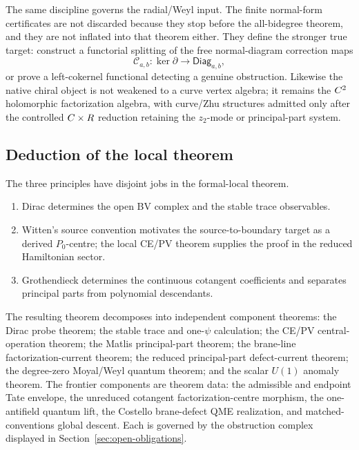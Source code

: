 The same discipline governs the radial/Weyl input.  The finite
normal-form certificates are not discarded because they stop before the
all-bidegree theorem, and they are not inflated into that theorem either.
They define the stronger true target: construct a functorial splitting
of the free normal-diagram correction maps
\[
  \mathcal C_{a,b}\colon
  \ker\partial\longrightarrow\mathsf{Diag}_{a,b},
\]
or prove a left-cokernel functional detecting a genuine obstruction.
Likewise the native chiral object is not weakened to a curve vertex
algebra; it remains the \(C^2\) holomorphic factorization algebra, with
curve/Zhu structures admitted only after the controlled
\(C\times R\) reduction retaining the \(z_2\)-mode or principal-part
system.

\subsection{Deduction of the local theorem}

The three principles have disjoint jobs in the formal-local theorem.

\begin{enumerate}
  \item Dirac determines the open BV complex and the stable trace
  observables.
  \item Witten's source convention motivates the source-to-boundary target as a
  derived \(P_0\)-centre; the local CE/PV theorem supplies the proof in
  the reduced Hamiltonian sector.
  \item Grothendieck determines the continuous cotangent coefficients
  and separates principal parts from polynomial descendants.
\end{enumerate}

The resulting theorem decomposes into independent
component theorems: the Dirac probe theorem; the stable trace and
one-\(\psi\) calculation; the CE/PV central-operation theorem; the Matlis
principal-part theorem; the brane-line factorization-current theorem;
the reduced principal-part defect-current theorem; the degree-zero
Moyal/Weyl quantum theorem; and the scalar \(U(1)\) anomaly theorem.
The frontier components are theorem data: the admissible and endpoint
Tate envelope, the unreduced cotangent factorization-centre morphism,
the one-antifield quantum lift, the Costello brane-defect QME
realization, and matched-conventions global descent.  Each is governed
by the obstruction complex displayed in
Section~\ref{sec:open-obligations}.
